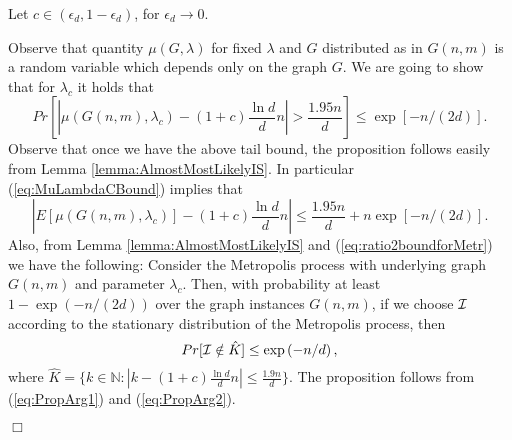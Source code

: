 \documentclass[a4paper,10pt]{article}
\makeatletter
\newenvironment{propositionproof}[1]{\noindent{\bf Proof of Proposition #1\@:}}{\hfill $\Box$\\}
\makeatother
\begin{document}
\begin{propositionproof}{\ref{prop:MostLikelyIS}}
Let $c\in (\epsilon_d,1-\epsilon_d)$, for $\epsilon_d\to 0$.

Observe that quantity $\mu(G,\lambda)$ for fixed $\lambda$ and
$G$ distributed as in $G(n,m)$ is a random variable which depends
only on the graph $G$.
We are going to show that for $\lambda_c$ it holds that
\begin{equation}\label{eq:MuLambdaCBound}
Pr\left[\left|\mu(G(n,m),\lambda_c)-(1+c)\frac{\ln d}{d}n\right|
> \frac{1.95n}{d}\right] \leq \exp\left[-n/(2d)\right].
\end{equation}
Observe that once we have the above tail bound,  the proposition
follows easily from Lemma \ref{lemma:AlmostMostLikelyIS}. In particular
(\ref{eq:MuLambdaCBound}) implies that 
\begin{equation}\label{eq:PropArg1}
\left|E[\mu(G(n,m),\lambda_c)]-(1+c)\frac{\ln d}{d}n\right|\leq \frac{1.95n}{d} +n\exp\left[-n/(2d)\right].
\end{equation}
Also, from Lemma \ref{lemma:AlmostMostLikelyIS} and (\ref{eq:ratio2boundforMetr})
we have the following: 
Consider the Metropolis process with underlying graph $G(n,m)$
and parameter $\lambda_c$. Then, with probability at least $1-\exp(-n/(2d))$
over the graph instances $G(n,m)$, if we choose ${\cal I}$ according
to the stationary distribution of the Metropolis process, then 
\begin{equation}\label{eq:PropArg2}
Pr[{\cal I}\notin \hat{K}]\leq \exp\left(-n/d\right),
\end{equation}
where $\hat{K}=\{k\in \mathbb{N}:|k-(1+c)\frac{\ln d}{d}n|\leq \frac{1.9n}{d}\}$.
The proposition follows from (\ref{eq:PropArg1}) and (\ref{eq:PropArg2}).


\end{propositionproof}
\end{document}
